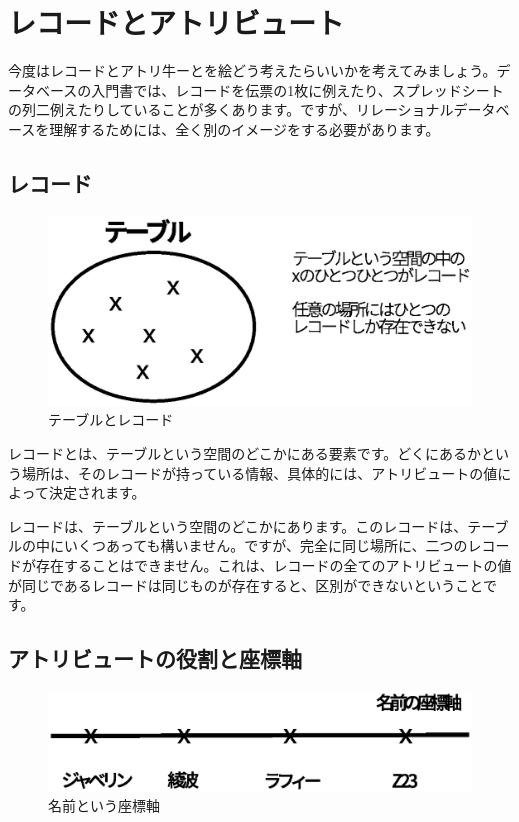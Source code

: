 \section{レコードとアトリビュート}

今度はレコードとアトリ牛ーとを絵どう考えたらいいかを考えてみましょう。データベースの入門書では、レコードを伝票の1枚に例えたり、スプレッドシートの列二例えたりしていることが多くあります。ですが、リレーショナルデータベースを理解するためには、全く別のイメージをする必要があります。

\subsection{レコード}

\begin{figure}[htbp]
	\includegraphics[width=12cm,clip]{draw/record.eps}
	\caption{テーブルとレコード}
	\label{fig:record}
\end{figure}

レコードとは、テーブルという空間のどこかにある要素です。どくにあるかという場所は、そのレコードが持っている情報、具体的には、アトリビュートの値によって決定されます。

レコードは、テーブルという空間のどこかにあります。このレコードは、テーブルの中にいくつあっても構いません。ですが、完全に同じ場所に、二つのレコードが存在することはできません。これは、レコードの全てのアトリビュートの値が同じであるレコードは同じものが存在すると、区別ができないということです。

\subsection{アトリビュートの役割と座標軸}

\begin{figure}[htbp]
	\includegraphics[width=12cm,clip]{draw/name_axis.eps}
	\caption{名前という座標軸}
	\label{fig:name_axis}
\end{figure}


